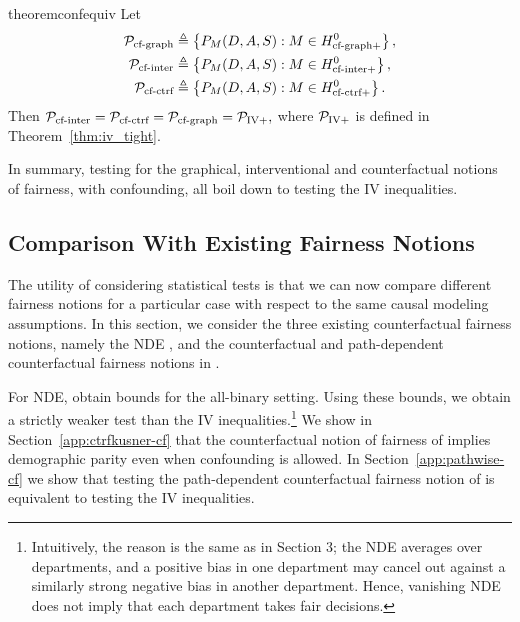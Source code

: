 \begin{restatable}{theorem}{confequiv}\label{thm:equivalence}
Let 
\begin{align*}
{\cal P}_{\text{cf-graph}} &\triangleq \left \lbrace P_{M}{\left({D,A, S}\right)} : M \in H^0_{\text{cf-graph}+} \right \rbrace, \\
{\cal P}_{\text{cf-inter}} &\triangleq \left \lbrace P_{M}{\left({D,A, S}\right)} : M \in H^0_{\text{cf-inter}+} \right \rbrace, \\
{\cal P}_{\text{cf-ctrf}} &\triangleq \left \lbrace P_{M}{\left({D,A, S}\right)} : M \in H^0_{\text{cf-ctrf}+} \right \rbrace.
\end{align*}
Then ${\cal P}_{\text{cf-inter}} = {\cal P}_{\text{cf-ctrf}} = {\cal P}_{\text{cf-graph}} = {\cal P}_{\text{IV}+},$ where ${\cal P}_{\text{IV}+}$ is defined in Theorem~\ref{thm:iv_tight}.
\end{restatable}

In summary, testing for the graphical, interventional and counterfactual notions of fairness, with confounding, all boil down to testing the IV inequalities.

\subsection{Comparison With Existing Fairness Notions}

The utility of considering statistical tests is that we can now compare different fairness notions for a particular case with respect to the same causal modeling assumptions. In this section, we consider the three existing counterfactual fairness notions, namely the NDE \citep{NabiShpitser18, Chiappa19}, and the counterfactual and path-dependent counterfactual fairness notions in \citet{KusnerLRS17}. 

For NDE, \citet{KaufmanKMGP05} obtain bounds for the all-binary setting. Using these bounds, we obtain a strictly weaker test than the IV inequalities.\footnote{Intuitively, the reason is the same as in Section 3; the NDE averages over departments, and a positive bias in one department may cancel out against a similarly strong negative bias in another department. Hence, vanishing NDE does not imply that each department takes fair decisions.} We show in Section~\ref{app:ctrfkusner-cf} that the counterfactual notion of fairness of \citet{KusnerLRS17} implies demographic parity even when confounding is allowed. In Section~\ref{app:pathwise-cf} we show that testing the path-dependent counterfactual fairness notion of \citet{KusnerLRS17} is equivalent to testing the IV inequalities.


